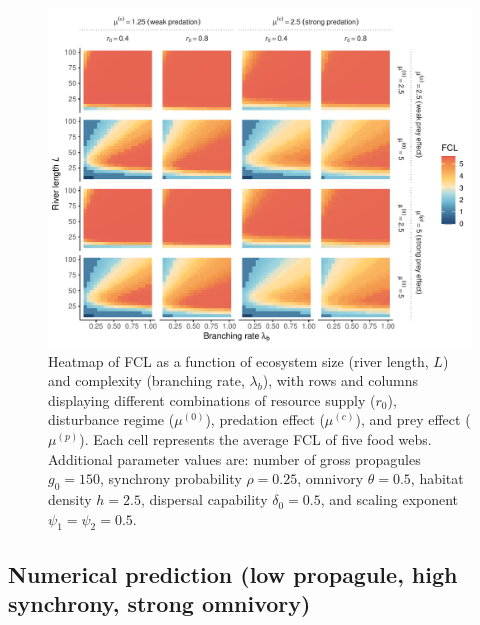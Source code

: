\begin{figure}
\centering
\includegraphics{../data_fmt/fig_rho025_g150_theta05.pdf}
\caption{Heatmap of FCL as a function of ecosystem size (river length,
\(L\)) and complexity (branching rate, \(\lambda_b\)), with rows and
columns displaying different combinations of resource supply (\(r_0\)),
disturbance regime (\(\mu^{(0)}\)), predation effect (\(\mu^{(c)}\)),
and prey effect (\(\mu^{(p)}\)). Each cell represents the average FCL of
five food webs. Additional parameter values are: number of gross
propagules \(g_0=150\), synchrony probability \(\rho=0.25\), omnivory
\(\theta=0.5\), habitat density \(h=2.5\), dispersal capability
\(\delta_0=0.5\), and scaling exponent \(\psi_1=\psi_2=0.5\).}
\end{figure}

\newpage

\subsection{Numerical prediction (low propagule, high synchrony, strong
omnivory)}\label{numerical-prediction-low-propagule-high-synchrony-strong-omnivory}

